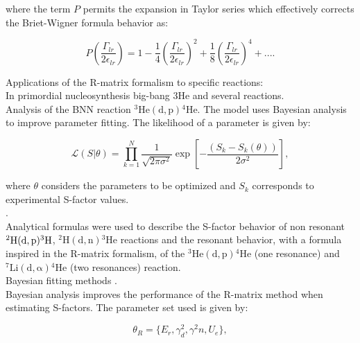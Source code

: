 \documentclass[openany]{book}
\begin{document}
where the term $P$ permits the expansion in Taylor series which effectively corrects the Briet-Wigner formula behavior as: 

\begin{equation}\label{eq:rmatrix_generalizedBW_expansion}
	 P \left(\frac{\Gamma_{lr}}{2\epsilon_{lr}}\right) = 1 - \frac{1}{4} \left(\frac{\Gamma_{lr}}{2\epsilon_{lr}}\right)^2 + \frac{1}{8} \left(\frac{\Gamma_{lr}}{2\epsilon_{lr}}\right) ^4 + ... .
\end{equation}


Applications of the R-matrix formalism to specific reactions: \\

In primordial nucleosynthesis \cite{desouza_iliadis_coc_2019} big-bang 3He and several reactions. \\

Analysis of the BNN reaction $\mathrm{{}^{3}He(d, p){}^{4}He}$. The model uses Bayesian analysis to improve parameter fitting. The likelihood of a parameter is given by:

\begin{equation}\label{eq:rmatrix_bayesian_likelihood}
	\mathcal{L}(S|\theta) = \prod_{k=1}^{N} \frac{1}{\sqrt{2\pi \sigma^2} } \exp {\left[- \frac{(S_k - S_k(\theta))}{2\sigma^2}\right]},
\end{equation}

where $\theta$ considers the parameters to be optimized and $S_k$ corresponds to experimental S-factor values. \\


\cite{sparta_pizzone_bertulani_hou_lamia_tumino_2020}. \\

Analytical formulas were used to describe the S-factor behavior of non resonant $\mathrm{{}^{2}H(d, p){}^{3}H}$, $\mathrm{{}^{2}H(d, n){}^{3}He}$ reactions and the resonant behavior, with a formula inspired in the R-matrix formalism, of the $\mathrm{{}^{3}He(d,p){}^{4}He}$ (one resonance) and $\mathrm{{}^{7}Li(d, \alpha){}^{4}He}$ (two resonances) reaction. \\

Bayesian fitting methods \cite{odell_brune_phillips_2022}. \\

Bayesian analysis improves the performance of the R-matrix method when estimating S-factors. The parameter set used is given by:

\begin{equation}\label{eq:rmatrix_parameterSet}
	\theta_{R} = \{E_r, \gamma^{2}_d, \gamma^{2}n, U_e\},
\end{equation}
\end{document}
